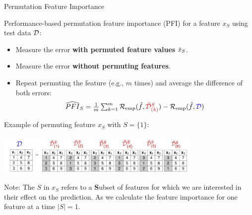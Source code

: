 \documentclass[11pt,compress,t,notes=noshow, xcolor=table]{beamer}
\begin{document}
\begin{vbframe}{Permutation Feature Importance}
\normalsize

Performance-based permutation feature importance (PFI) for a feature $x_S$ using test data $\D$:
\begin{itemize}
  \item Measure the error \color{red}\textbf{with permuted feature values} \color{black} $\pert{x}{}{}_S$.
  \item Measure the error \color{blue}\textbf{without permuting features}\color{black}.
  \item Repeat permuting the feature (e.g., $m$ times) and average the difference of both errors: 
$$\widehat{PFI}_S = \tfrac{1}{m} \textstyle\sum\nolimits_{k = 1}^{m} \riske (\fh, {\color{red}\pert{\D}{S}{}_{(k)}}) - \riske (\fh, {\color{blue}\D})$$
\end{itemize}

Example of permuting feature $x_S$ with $S = \{1\}$:

\begin{center}
\includegraphics[width=0.75\textwidth]{figure_man/permuted-fv.pdf}
\end{center}

\vspace*{0.2cm}
{\scriptsize{Note: 
The $S$ in $x_S$ refers to a \textbf{S}ubset of features for which we are interested in their effect on the prediction.
As we calculate the feature importance for one feature at a time $|S| = 1$.}\par}

\end{vbframe}
\end{document}

